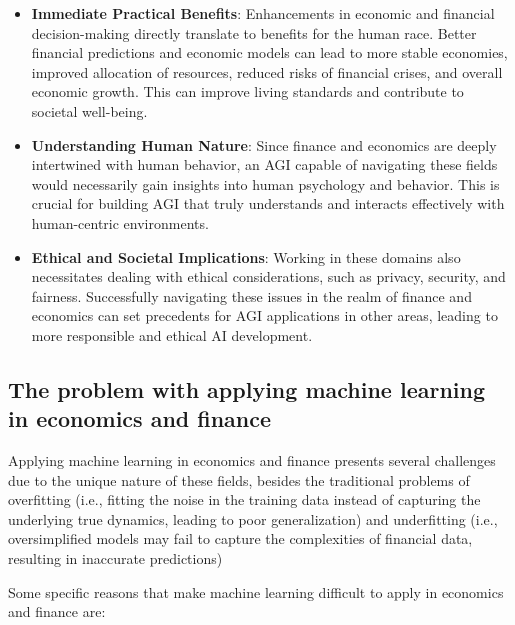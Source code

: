 \documentclass[11pt, reqno]{amsart}
\theoremstyle{definition}
\theoremstyle{remark}
\begin{document}
\begin{itemize}
    \item \textbf{Immediate Practical Benefits}: Enhancements in economic and financial
      decision-making directly translate to benefits for the human race. Better
      financial predictions and economic models can lead to more stable
      economies, improved allocation of resources, reduced risks of financial
      crises, and overall economic growth. This can improve living standards and
      contribute to societal well-being.

    \item \textbf{Understanding Human Nature}: Since finance and economics are deeply
      intertwined with human behavior, an AGI capable of navigating these fields
      would necessarily gain insights into human psychology and behavior. This is
      crucial for building AGI that truly understands and interacts effectively with
      human-centric environments.

    \item \textbf{Ethical and Societal Implications}: Working in these domains also
      necessitates dealing with ethical considerations, such as privacy, security,
      and fairness. Successfully navigating these issues in the realm of finance
      and economics can set precedents for AGI applications in other areas,
      leading to more responsible and ethical AI development.
  \end{itemize}

  \subsection{The problem with applying machine learning in economics and
  finance}

  Applying machine learning in economics and finance presents several challenges
  due to the unique nature of these fields, besides the traditional problems of overfitting
  (i.e., fitting the noise in the training data instead of capturing the
  underlying true dynamics, leading to poor generalization) and underfitting (i.e.,
  oversimplified models may fail to capture the complexities of financial data,
  resulting in inaccurate predictions)

  Some specific reasons that make machine learning difficult to apply in
  economics and finance are:
\end{document}
